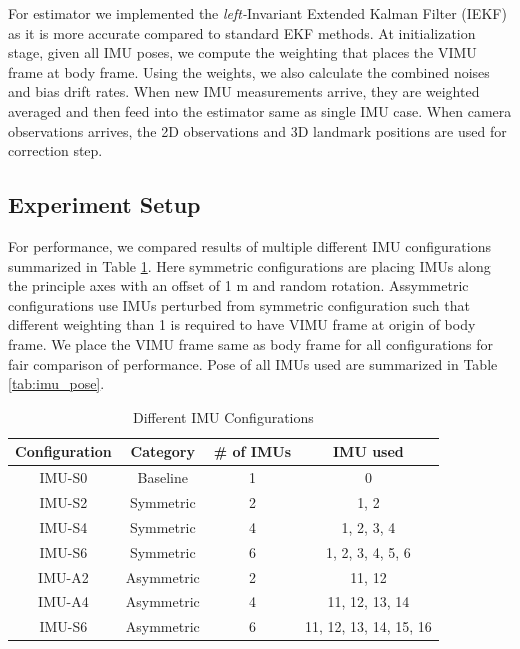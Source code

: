 \documentclass[conference]{IEEEtran}
\begin{document}
For estimator we implemented the \textit{left-}Invariant Extended Kalman Filter (IEKF) \cite{IEKF} as it is more accurate compared to standard EKF methods. At initialization stage, given all IMU poses, we compute the weighting that places the VIMU frame at body frame. Using the weights, we also calculate the combined noises and bias drift rates. When new IMU measurements arrive, they are weighted averaged and then feed into the estimator same as single IMU case. When camera observations arrives, the 2D observations and 3D landmark positions are used for correction step.

\subsection{Experiment Setup}

For performance, we compared results of multiple different IMU configurations summarized in Table \ref{tab:imu_config}. Here symmetric configurations are placing IMUs along the principle axes with an offset of 1 m and random rotation. Assymmetric configurations use IMUs perturbed from symmetric configuration such that different weighting than 1 is required to have VIMU frame at origin of body frame. We place the VIMU frame same as body frame for all configurations for fair comparison of performance. Pose of all IMUs used are summarized in Table \ref{tab:imu_pose}.

\begin{table}[h!]
\centering
\caption{Different IMU Configurations}
\label{tab:imu_config}
\begin{tabular}{cccc}
\toprule
\textbf{Configuration} & \textbf{Category} & \textbf{\# of IMUs} & \textbf{IMU used}  \\
\midrule
IMU-S0 & Baseline  & 1 & 0 \\
\midrule
IMU-S2 & Symmetric & 2 & 1, 2 \\
IMU-S4 & Symmetric & 4 & 1, 2, 3, 4 \\
IMU-S6 & Symmetric & 6 & 1, 2, 3, 4, 5, 6 \\
\midrule
IMU-A2 & Asymmetric & 2 & 11, 12 \\
IMU-A4 & Asymmetric & 4 & 11, 12, 13, 14 \\
IMU-S6 & Asymmetric & 6 & 11, 12, 13, 14, 15, 16 \\

\bottomrule
\end{tabular}
\end{table}
\end{document}
